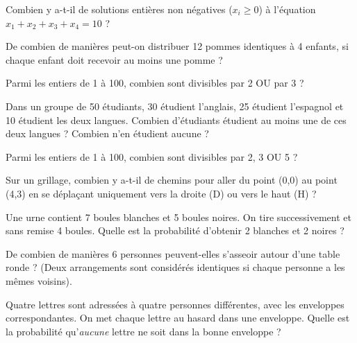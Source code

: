 \begin{exercicebox}
Combien y a-t-il de solutions entières non négatives ($x_i \ge 0$) à l'équation $x_1 + x_2 + x_3 + x_4 = 10$ ?
\end{exercicebox}

\begin{exercicebox}
De combien de manières peut-on distribuer 12 pommes identiques à 4 enfants, si chaque enfant doit recevoir au moins une pomme ?
\end{exercicebox}


\begin{exercicebox}
Parmi les entiers de 1 à 100, combien sont divisibles par 2 OU par 3 ?
\end{exercicebox}

\begin{exercicebox}
Dans un groupe de 50 étudiants, 30 étudient l'anglais, 25 étudient l'espagnol et 10 étudient les deux langues. Combien d'étudiants étudient au moins une de ces deux langues ? Combien n'en étudient aucune ?
\end{exercicebox}

\begin{exercicebox}
Parmi les entiers de 1 à 100, combien sont divisibles par 2, 3 OU 5 ?
\end{exercicebox}


\begin{exercicebox}
Sur un grillage, combien y a-t-il de chemins pour aller du point (0,0) au point (4,3) en se déplaçant uniquement vers la droite (D) ou vers le haut (H) ?
\end{exercicebox}

\begin{exercicebox}
Une urne contient 7 boules blanches et 5 boules noires. On tire successivement et sans remise 4 boules. Quelle est la probabilité d'obtenir 2 blanches et 2 noires ?
\end{exercicebox}

\begin{exercicebox}
De combien de manières 6 personnes peuvent-elles s'asseoir autour d'une table ronde ? (Deux arrangements sont considérés identiques si chaque personne a les mêmes voisins).
\end{exercicebox}

\begin{exercicebox}
Quatre lettres sont adressées à quatre personnes différentes, avec les enveloppes correspondantes. On met chaque lettre au hasard dans une enveloppe. Quelle est la probabilité qu'\textit{aucune} lettre ne soit dans la bonne enveloppe ?
\end{exercicebox}